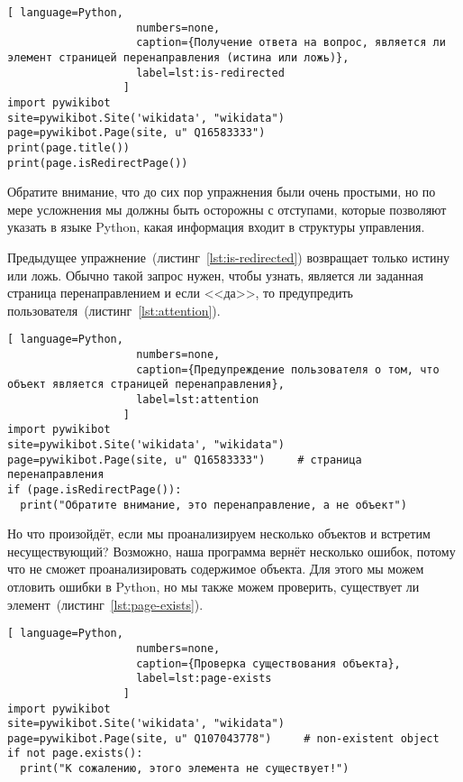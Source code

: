\begin{lstlisting}[ language=Python,
                    numbers=none,
                    caption={Получение ответа на вопрос, является ли элемент страницей перенаправления (истина или ложь)},
                    label=lst:is-redirected
                  ]
import pywikibot
site=pywikibot.Site('wikidata', "wikidata")
page=pywikibot.Page(site, u" Q16583333")
print(page.title())
print(page.isRedirectPage())
\end{lstlisting}

Обратите внимание, что до сих пор упражнения были очень простыми, но по мере усложнения мы должны быть осторожны с отступами, которые позволяют указать в языке Python, какая информация входит в структуры управления.

Предыдущее упражнение~(листинг~\ref{lst:is-redirected}) возвращает только истину или ложь. Обычно такой запрос нужен, чтобы узнать, является ли заданная страница перенаправлением и если <<да>>, то предупредить пользователя~(листинг~\ref{lst:attention}).

\begin{lstlisting}[ language=Python,
                    numbers=none,
                    caption={Предупреждение пользователя о том, что объект является страницей перенаправления},
                    label=lst:attention
                  ]
import pywikibot
site=pywikibot.Site('wikidata', "wikidata")
page=pywikibot.Page(site, u" Q16583333")     # страница перенаправления
if (page.isRedirectPage()):
  print("Обратите внимание, это перенаправление, а не объект")
\end{lstlisting}

Но что произойдёт, если мы проанализируем несколько объектов и встретим несуществующий? Возможно, наша программа вернёт несколько ошибок, потому что не сможет проанализировать содержимое объекта. Для этого мы можем отловить ошибки в Python, но мы также можем проверить, существует ли элемент~(листинг~\ref{lst:page-exists}).

\begin{lstlisting}[ language=Python,
                    numbers=none,
                    caption={Проверка существования объекта},
                    label=lst:page-exists
                  ]
import pywikibot
site=pywikibot.Site('wikidata', "wikidata")
page=pywikibot.Page(site, u" Q107043778")     # non-existent object
if not page.exists():
  print("К сожалению, этого элемента не существует!")
\end{lstlisting}

